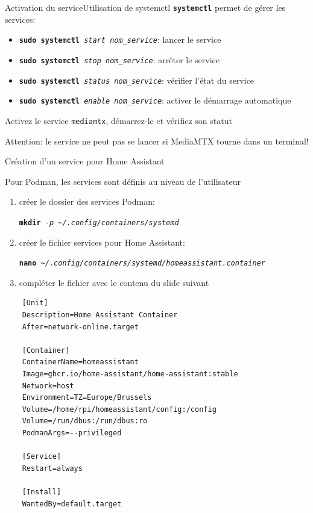 \documentclass[
aspectratio=169 %
]{beamer}
\newcommand{\cmd}[1]{\texttt{\textbf{#1}}}
\newcommand{\args}[1]{\texttt{\textit{#1}}}
\begin{document}
\begin{frame}[fragile]{Activation du service}{Utilisation de systemctl}
    \cmd{systemctl} permet de gérer les services:
    \begin{itemize}
        \item \cmd{sudo systemctl}\args{ start nom\_service}: lancer le service
        \item \cmd{sudo systemctl}\args{ stop nom\_service}: arrêter le service
        \item \cmd{sudo systemctl}\args{ status nom\_service}: vérifier l'état
              du
              service
        \item \cmd{sudo systemctl}\args{ enable nom\_service}: activer le
              démarrage automatique
    \end{itemize}

    \bigskip
    Activez le service \texttt{mediamtx}, démarrez-le et vérifiez son statut

    \bigskip

    \alert{Attention}: le service ne peut pas se lancer si MediaMTX tourne dans
    un terminal!
\end{frame}

\begin{frame}[fragile]{Création d'un service pour Home Assistant}

    Pour Podman, les services sont définis au niveau de l'utilisateur

    \begin{enumerate}
        \item créer le dossier des services Podman:

              \cmd{mkdir}\args{ -p \textasciitilde/.config/containers/systemd}
        \item créer le fichier services pour Home Assistant:

              \cmd{nano}\args{
                  \textasciitilde/.config/containers/systemd/homeassistant.container}
        \item compléter le fichier avec le contenu du slide suivant
    \end{enumerate}

\end{frame}

\begin{frame}[fragile]
    \begin{lstlisting}
    [Unit]
    Description=Home Assistant Container
    After=network-online.target

    [Container]
    ContainerName=homeassistant
    Image=ghcr.io/home-assistant/home-assistant:stable
    Network=host
    Environment=TZ=Europe/Brussels
    Volume=/home/rpi/homeassistant/config:/config
    Volume=/run/dbus:/run/dbus:ro
    PodmanArgs=--privileged

    [Service]
    Restart=always

    [Install]
    WantedBy=default.target
    \end{lstlisting}
\end{frame}
\end{document}
